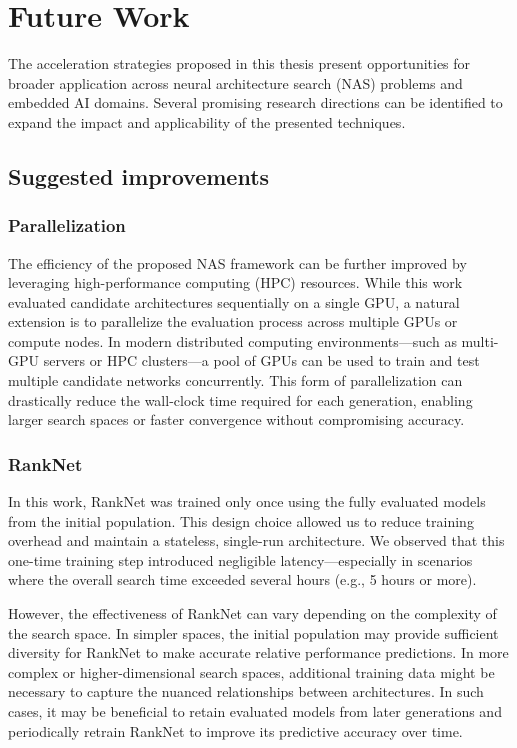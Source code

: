 \chapter{Future Work}

The acceleration strategies proposed in this thesis present opportunities for broader application across neural architecture search (NAS) problems and embedded AI domains. Several promising research directions can be identified to expand the impact and applicability of the presented techniques.

\section{Suggested improvements}

\subsection{Parallelization}

The efficiency of the proposed NAS framework can be further improved by leveraging high-performance computing (HPC) resources. While this work evaluated candidate architectures sequentially on a single GPU, a natural extension is to parallelize the evaluation process across multiple GPUs or compute nodes. In modern distributed computing environments—such as multi-GPU servers or HPC clusters—a pool of GPUs can be used to train and test multiple candidate networks concurrently. This form of parallelization can drastically reduce the wall-clock time required for each generation, enabling larger search spaces or faster convergence without compromising accuracy.


\subsection{RankNet}

In this work, RankNet was trained only once using the fully evaluated models from the initial population. This design choice allowed us to reduce training overhead and maintain a stateless, single-run architecture. We observed that this one-time training step introduced negligible latency—especially in scenarios where the overall search time exceeded several hours (e.g., 5 hours or more).

However, the effectiveness of RankNet can vary depending on the complexity of the search space. In simpler spaces, the initial population may provide sufficient diversity for RankNet to make accurate relative performance predictions. In more complex or higher-dimensional search spaces, additional training data might be necessary to capture the nuanced relationships between architectures. In such cases, it may be beneficial to retain evaluated models from later generations and periodically retrain RankNet to improve its predictive accuracy over time.

